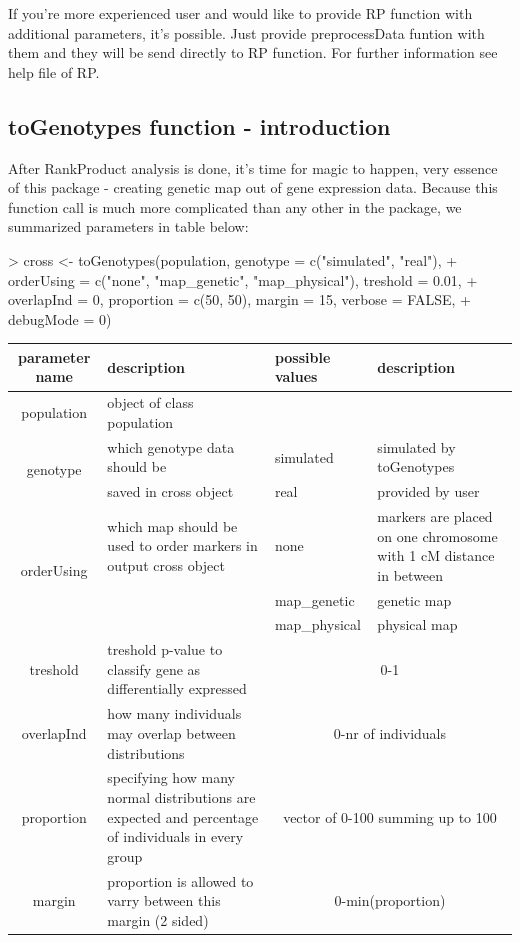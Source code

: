 \documentclass{article}
\begin{document}
{\noindent}If you're more experienced user and would like to provide RP function with additional parameters, it's possible. Just provide preprocessData funtion with them and they will be send directly to RP function. For further information see help file of RP.

\subsection{toGenotypes function - introduction}
After RankProduct analysis is done, it's time for magic to happen,  very essence of this package - creating genetic map out of gene expression data. Because this function call is much more complicated than any other in the 
package, we summarized parameters in table below:
\begin{Schunk}
\begin{Sinput}
> cross <- toGenotypes(population, genotype = c("simulated", "real"), 
+     orderUsing = c("none", "map_genetic", "map_physical"), treshold = 0.01, 
+     overlapInd = 0, proportion = c(50, 50), margin = 15, verbose = FALSE, 
+     debugMode = 0)
\end{Sinput}
\end{Schunk}

\begin{tabular}{ | c | p{5.5cm} | p{3cm} | p{4.5cm}| }
  \hline                       
  parameter name & description & possible values & description \\ \hline
  population & object of class population &  &  \\ \hline
  \multirow{2}{*}{genotype} & which genotype data should be & simulated & simulated by toGenotypes \\ \cline{3-4}
  & saved in cross object & real & provided by user \\ \hline  
   \multirow{3}{*}{orderUsing} & which map should be used to order markers in output cross object& none & markers are placed on one chromosome with 1 cM distance in between \\ \cline{3-4}
  &  & map\_genetic & genetic map \\ \cline{3-4} 
  &  & map\_physical & physical map \\ \hline  
  treshold & treshold p-value to classify gene as differentially expressed & \multicolumn{2}{|c|}{0-1} \\ \hline
  overlapInd & how many individuals may overlap between distributions & \multicolumn{2}{|c|}{0-nr of individuals}  \\ \hline
  proportion & specifying how many normal distributions are expected and percentage of individuals in every group  & \multicolumn{2}{|c|}{vector of 0-100 summing up to 100}  \\ \hline
  margin & proportion is allowed to varry between this margin (2 sided)  & \multicolumn{2}{|c|}{0-min(proportion)}  \\ \hline
\end{tabular}
\newpage
\end{document}
